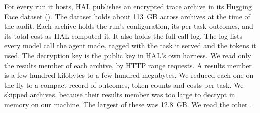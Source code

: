 \documentclass[11pt]{article}
\begin{document}
For every run it hosts, HAL publishes an encrypted trace archive in its Hugging Face dataset (). The dataset holds about 113~GB across \NumHalUploadsIndexed{} archives at the time of the audit. Each archive holds the run's configuration, its per-task outcomes, and its total cost as HAL computed it. It also holds the full call log. The log lists every model call the agent made, tagged with the task it served and the tokens it used. The decryption key is the public key in HAL's own harness. We read only the results member of each archive, by HTTP range requests. A results member is a few hundred kilobytes to a few hundred megabytes. We reduced each one on the fly to a compact record of outcomes, token counts and costs per task. We skipped \NumHalUploadsSkipped{} archives, because their results member was too large to decrypt in memory on our machine. The largest of these was 12.8~GB. We read the other \NumHalUploadsRead{}.
\end{document}
